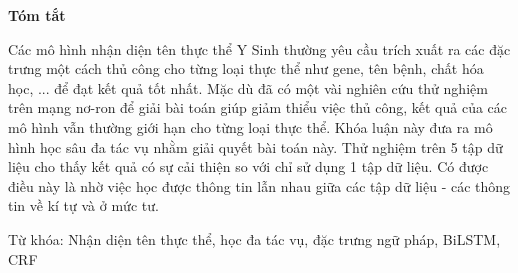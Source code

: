 \documentclass[../main.tex]{subfiles}
\begin{document}
\begin{center}
  \LARGE{\textbf{Tóm tắt}}
  \\[1cm]
\end{center}

Các mô hình nhận diện tên thực thể Y Sinh thường yêu cầu trích xuất ra các đặc trưng một cách thủ công cho từng loại thực thể như gene, tên bệnh, chất hóa học, ... để đạt kết quả tốt nhất. Mặc dù đã có một vài nghiên cứu thử nghiệm trên mạng nơ-ron để giải bài toán giúp giảm thiểu việc thủ công, kết quả của các mô hình vẫn thường giới hạn cho từng loại thực thể. Khóa luận này đưa ra mô hình học sâu đa tác vụ nhằm giải quyết bài toán này. Thử nghiệm trên 5 tập dữ liệu cho thấy kết quả có sự cải thiện so với chỉ sử dụng 1 tập dữ liệu. Có được điều này là nhờ việc học được thông tin lẫn nhau giữa các tập dữ liệu - các thông tin về kí tự và ở mức tư.

Từ khóa: Nhận diện tên thực thể, học đa tác vụ, đặc trưng ngữ pháp, BiLSTM, CRF 
\end{document}
